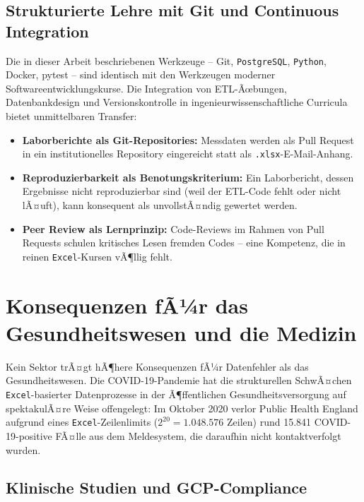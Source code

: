 ﻿\documentclass[12pt,a4paper]{report}
\theoremstyle{definition}
\theoremstyle{remark}
\newcommand{\excel}{\texttt{Excel}}
\newcommand{\pg}{\texttt{PostgreSQL}}
\newcommand{\py}{\texttt{Python}}
\newcommand{\code}[1]{\texttt{#1}}
\begin{document}
\subsection{Strukturierte Lehre mit Git und Continuous Integration}

Die in dieser Arbeit beschriebenen Werkzeuge -- Git, \pg{}, \py{},
Docker, pytest -- sind identisch mit den Werkzeugen moderner
Softwareentwicklungskurse.
Die Integration von ETL-Ãœbungen, Datenbankdesign und Versionskontrolle
in ingenieurwissenschaftliche Curricula bietet unmittelbaren Transfer:
\begin{itemize}[leftmargin=1.5em, itemsep=2pt]
  \item \textbf{Laborberichte als Git-Repositories:} Messdaten werden
        als Pull Request in ein institutionelles Repository eingereicht
        statt als \code{.xlsx}-E-Mail-Anhang.
  \item \textbf{Reproduzierbarkeit als Benotungskriterium:}
        Ein Laborbericht, dessen Ergebnisse nicht reproduzierbar sind
        (weil der ETL-Code fehlt oder nicht lÃ¤uft), kann konsequent
        als unvollstÃ¤ndig gewertet werden.
  \item \textbf{Peer Review als Lernprinzip:}
        Code-Reviews im Rahmen von Pull Requests schulen kritisches
        Lesen fremden Codes -- eine Kompetenz, die in reinen
        \excel-Kursen vÃ¶llig fehlt.
\end{itemize}

\section{Konsequenzen fÃ¼r das Gesundheitswesen und die Medizin}

Kein Sektor trÃ¤gt hÃ¶here Konsequenzen fÃ¼r Datenfehler als das
Gesundheitswesen. Die COVID-19-Pandemie hat die strukturellen SchwÃ¤chen
\excel-basierter Datenprozesse in der Ã¶ffentlichen Gesundheitsversorgung
auf spektakulÃ¤re Weise offengelegt:
Im Oktober 2020 verlor Public Health England aufgrund eines
\excel-Zeilenlimits ($2^{20} = 1{.}048{.}576$ Zeilen) rund 15.841
COVID-19-positive FÃ¤lle aus dem Meldesystem, die daraufhin nicht
kontaktverfolgt wurden.

\subsection{Klinische Studien und GCP-Compliance}
\end{document}
